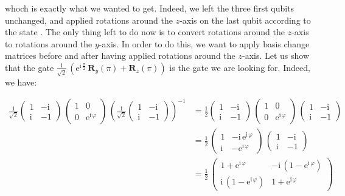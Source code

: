 \documentclass[11pt, a4paper]{article}
\begin{document}
                whoch is exactly what we wanted to get. Indeed, we left the three first qubits unchanged, and applied rotations around the \(z\)-axis on the last qubit according to the state . The only thing left to do now is to convert rotations around the \(z\)-axis to rotations around the \(y\)-axis. In order to do this, we want to apply basis change matrices before and after having applied rotations around the \(z\)-axis. Let us show that the gate \(\frac{1}{\sqrt{2}}\,\left(\mathrm{e}^{\mathrm{i}\,\frac\pi2}\,\mathbf{R}_y(\pi)+\mathbf{R}_z(\pi)\right)\) is the gate we are looking for. Indeed, we have:
                
                \begin{align*}
                    \frac{1}{\sqrt{2}}\begin{pmatrix}1&-\mathrm{i}\\\mathrm{i} & -1\end{pmatrix}\,\begin{pmatrix}1&0\\0&\mathrm{e}^{\mathrm{i}\,\varphi}\end{pmatrix}\,\left(\frac{1}{\sqrt{2}}\begin{pmatrix}1&-\mathrm{i}\\\mathrm{i} & -1\end{pmatrix}\right)^{-1} &= \frac12\begin{pmatrix}1&-\mathrm{i}\\\mathrm{i} & -1\end{pmatrix}\,\begin{pmatrix}1&0\\0&\mathrm{e}^{\mathrm{i}\,\varphi}\end{pmatrix}\,\begin{pmatrix}1&-\mathrm{i}\\\mathrm{i} & -1\end{pmatrix}\\
                    &= \frac12\,\begin{pmatrix}1&-\mathrm{i}\,\mathrm{e}^{\mathrm{i}\,\varphi}\\\mathrm{i} & -\mathrm{e}^{\mathrm{i}\,\varphi}\end{pmatrix}\,\begin{pmatrix}1&-\mathrm{i}\\\mathrm{i} & -1\end{pmatrix}\\
                    &= \frac12\,\begin{pmatrix}1+\mathrm{e}^{\mathrm{i}\,\varphi} & -\mathrm{i}\,\left(1-\mathrm{e}^{\mathrm{i}\,\varphi}\right)\\\mathrm{i}\,\left(1-\mathrm{e}^{\mathrm{i}\,\varphi}\right) & 1 + \mathrm{e}^{\mathrm{i}\,\varphi}\end{pmatrix}\\

\end{align*}
\end{document}
